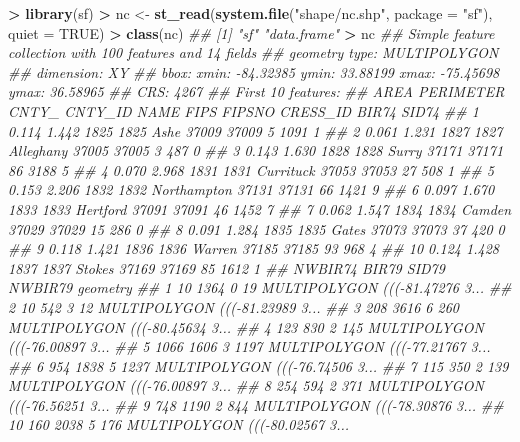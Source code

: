 \documentclass[]{article}
\newenvironment{Shaded}{\begin{snugshade}}{\end{snugshade}}
\newcommand{\CommentTok}[1]{\textcolor[rgb]{0.56,0.35,0.01}{\textit{#1}}}
\newcommand{\DataTypeTok}[1]{\textcolor[rgb]{0.13,0.29,0.53}{#1}}
\newcommand{\KeywordTok}[1]{\textcolor[rgb]{0.13,0.29,0.53}{\textbf{#1}}}
\newcommand{\NormalTok}[1]{#1}
\newcommand{\OperatorTok}[1]{\textcolor[rgb]{0.81,0.36,0.00}{\textbf{#1}}}
\newcommand{\OtherTok}[1]{\textcolor[rgb]{0.56,0.35,0.01}{#1}}
\newcommand{\StringTok}[1]{\textcolor[rgb]{0.31,0.60,0.02}{#1}}
\theoremstyle{definition}
\theoremstyle{definition}
\theoremstyle{definition}
\theoremstyle{remark}
\begin{document}
\begin{Shaded}
\begin{Highlighting}[]
\OperatorTok{>}\StringTok{ }\KeywordTok{library}\NormalTok{(sf)}
\OperatorTok{>}\StringTok{ }\NormalTok{nc <-}\StringTok{ }\KeywordTok{st_read}\NormalTok{(}\KeywordTok{system.file}\NormalTok{(}\StringTok{"shape/nc.shp"}\NormalTok{, }\DataTypeTok{package =} \StringTok{"sf"}\NormalTok{), }\DataTypeTok{quiet =} \OtherTok{TRUE}\NormalTok{)}
\OperatorTok{>}\StringTok{ }\KeywordTok{class}\NormalTok{(nc)}
\CommentTok{## [1] "sf"         "data.frame"}
\OperatorTok{>}\StringTok{ }\NormalTok{nc}
\CommentTok{## Simple feature collection with 100 features and 14 fields}
\CommentTok{## geometry type:  MULTIPOLYGON}
\CommentTok{## dimension:      XY}
\CommentTok{## bbox:           xmin: -84.32385 ymin: 33.88199 xmax: -75.45698 ymax: 36.58965}
\CommentTok{## CRS:            4267}
\CommentTok{## First 10 features:}
\CommentTok{##     AREA PERIMETER CNTY_ CNTY_ID        NAME  FIPS FIPSNO CRESS_ID BIR74 SID74}
\CommentTok{## 1  0.114     1.442  1825    1825        Ashe 37009  37009        5  1091     1}
\CommentTok{## 2  0.061     1.231  1827    1827   Alleghany 37005  37005        3   487     0}
\CommentTok{## 3  0.143     1.630  1828    1828       Surry 37171  37171       86  3188     5}
\CommentTok{## 4  0.070     2.968  1831    1831   Currituck 37053  37053       27   508     1}
\CommentTok{## 5  0.153     2.206  1832    1832 Northampton 37131  37131       66  1421     9}
\CommentTok{## 6  0.097     1.670  1833    1833    Hertford 37091  37091       46  1452     7}
\CommentTok{## 7  0.062     1.547  1834    1834      Camden 37029  37029       15   286     0}
\CommentTok{## 8  0.091     1.284  1835    1835       Gates 37073  37073       37   420     0}
\CommentTok{## 9  0.118     1.421  1836    1836      Warren 37185  37185       93   968     4}
\CommentTok{## 10 0.124     1.428  1837    1837      Stokes 37169  37169       85  1612     1}
\CommentTok{##    NWBIR74 BIR79 SID79 NWBIR79                       geometry}
\CommentTok{## 1       10  1364     0      19 MULTIPOLYGON (((-81.47276 3...}
\CommentTok{## 2       10   542     3      12 MULTIPOLYGON (((-81.23989 3...}
\CommentTok{## 3      208  3616     6     260 MULTIPOLYGON (((-80.45634 3...}
\CommentTok{## 4      123   830     2     145 MULTIPOLYGON (((-76.00897 3...}
\CommentTok{## 5     1066  1606     3    1197 MULTIPOLYGON (((-77.21767 3...}
\CommentTok{## 6      954  1838     5    1237 MULTIPOLYGON (((-76.74506 3...}
\CommentTok{## 7      115   350     2     139 MULTIPOLYGON (((-76.00897 3...}
\CommentTok{## 8      254   594     2     371 MULTIPOLYGON (((-76.56251 3...}
\CommentTok{## 9      748  1190     2     844 MULTIPOLYGON (((-78.30876 3...}
\CommentTok{## 10     160  2038     5     176 MULTIPOLYGON (((-80.02567 3...}
\end{Highlighting}
\end{Shaded}
\end{document}
